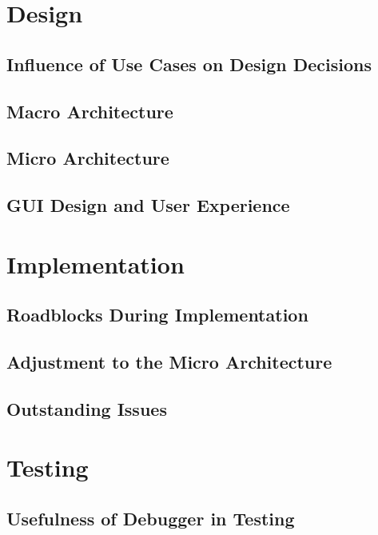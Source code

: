 \documentclass[a4paper]{article}
\begin{document}
\section{Design}

\subsection{Influence of Use Cases on Design Decisions}

\subsection{Macro Architecture}

\subsection{Micro Architecture}

\subsection{GUI Design and User Experience}

\section{Implementation}

\subsection{Roadblocks During Implementation}

\subsection{Adjustment to the Micro Architecture}

\subsection{Outstanding Issues}

\section{Testing}

\subsection{Usefulness of Debugger in Testing}
\end{document}
